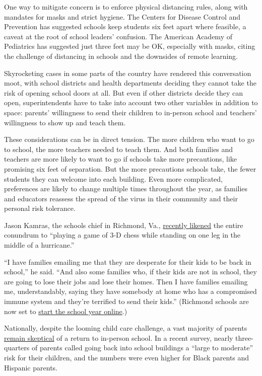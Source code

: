 One way to mitigate concern is to enforce physical distancing rules,
along with mandates for masks and strict hygiene. The Centers for
Disease Control and Prevention has suggested schools keep students six
feet apart where feasible, a caveat at the root of school leaders'
confusion. The American Academy of Pediatrics has suggested just three
feet may be OK, especially with masks, citing the challenge of
distancing in schools and the downsides of remote learning.

Skyrocketing cases in some parts of the country have rendered this
conversation moot, with school districts and health departments deciding
they cannot take the risk of opening school doors at all. But even if
other districts decide they can open, superintendents have to take into
account two other variables in addition to space: parents' willingness
to send their children to in-person school and teachers' willingness to
show up and teach them.

These considerations can be in direct tension. The more children who
want to go to school, the more teachers needed to teach them. And both
families and teachers are more likely to want to go if schools take more
precautions, like promising six feet of separation. But the more
precautions schools take, the fewer students they can welcome into each
building. Even more complicated, preferences are likely to change
multiple times throughout the year, as families and educators reassess
the spread of the virus in their community and their personal risk
tolerance.

Jason Kamras, the schools chief in Richmond, Va.,
\href{https://twitter.com/jasonkamras/status/1280870903610556417}{recently
likened} the entire conundrum to ``playing a game of 3-D chess while
standing on one leg in the middle of a hurricane.''

``I have families emailing me that they are desperate for their kids to
be back in school,'' he said. ``And also some families who, if their
kids are not in school, they are going to lose their jobs and lose their
homes. Then I have families emailing me, understandably, saying they
have somebody at home who has a compromised immune system and they're
terrified to send their kids.'' (Richmond schools are now set to
\href{https://richmond.com/news/local/richmond-public-schools-will-have-fully-virtual-learning-in-the-fall-because-of-covid-19/article_bcfe040f-7aa5-5c5b-b93a-feeeee56291e.html}{start
the school year online}.)

Nationally, despite the looming child care challenge, a vast majority of
parents
\href{https://www.chalkbeat.org/2020/7/14/21324873/school-closure-reopening-parents-surveys}{remain
skeptical} of a return to in-person school. In a recent survey, nearly
three-quarters of parents called going back into school buildings a
``large to moderate'' risk for their children, and the numbers were even
higher for Black parents and Hispanic parents.

